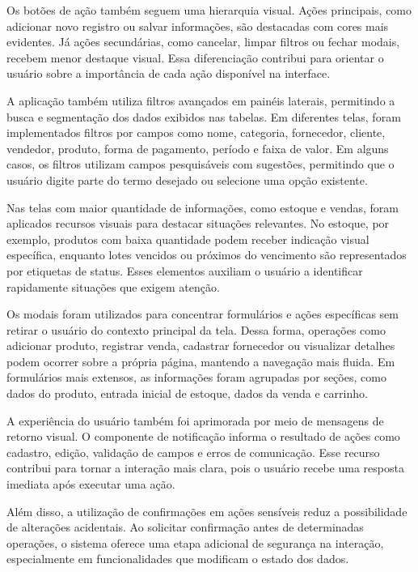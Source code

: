 Os botões de ação também seguem uma hierarquia visual. Ações principais, como adicionar novo registro ou salvar informações, são destacadas com cores mais evidentes. Já ações secundárias, como cancelar, limpar filtros ou fechar modais, recebem menor destaque visual. Essa diferenciação contribui para orientar o usuário sobre a importância de cada ação disponível na interface.

A aplicação também utiliza filtros avançados em painéis laterais, permitindo a busca e segmentação dos dados exibidos nas tabelas. Em diferentes telas, foram implementados filtros por campos como nome, categoria, fornecedor, cliente, vendedor, produto, forma de pagamento, período e faixa de valor. Em alguns casos, os filtros utilizam campos pesquisáveis com sugestões, permitindo que o usuário digite parte do termo desejado ou selecione uma opção existente.

Nas telas com maior quantidade de informações, como estoque e vendas, foram aplicados recursos visuais para destacar situações relevantes. No estoque, por exemplo, produtos com baixa quantidade podem receber indicação visual específica, enquanto lotes vencidos ou próximos do vencimento são representados por etiquetas de status. Esses elementos auxiliam o usuário a identificar rapidamente situações que exigem atenção.

Os modais foram utilizados para concentrar formulários e ações específicas sem retirar o usuário do contexto principal da tela. Dessa forma, operações como adicionar produto, registrar venda, cadastrar fornecedor ou visualizar detalhes podem ocorrer sobre a própria página, mantendo a navegação mais fluida. Em formulários mais extensos, as informações foram agrupadas por seções, como dados do produto, entrada inicial de estoque, dados da venda e carrinho.

A experiência do usuário também foi aprimorada por meio de mensagens de retorno visual. O componente de notificação informa o resultado de ações como cadastro, edição, validação de campos e erros de comunicação. Esse recurso contribui para tornar a interação mais clara, pois o usuário recebe uma resposta imediata após executar uma ação.

Além disso, a utilização de confirmações em ações sensíveis reduz a possibilidade de alterações acidentais. Ao solicitar confirmação antes de determinadas operações, o sistema oferece uma etapa adicional de segurança na interação, especialmente em funcionalidades que modificam o estado dos dados.

